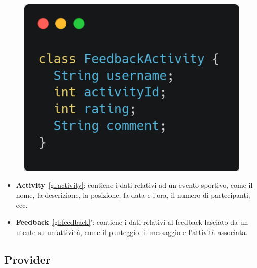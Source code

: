 \documentclass[a4paper,12pt]{article}
\begin{document}
\begin{figure}[h]
\begin{minipage}{0.45\textwidth}
        \includegraphics[width=0.9\linewidth]{img/feedback.png}
    \end{minipage}
\end{figure}


\begin{itemize}
    \item \textbf{Activity}~\ref{gl:activity}: contiene i dati relativi ad un evento sportivo, come il nome, la descrizione, la posizione, la data e l'ora, il numero di partecipanti, ecc.
    \item \textbf{Feedback}~\ref{gl:feedback}': contiene i dati relativi al feedback lasciato da un utente su un'attività, come il punteggio, il messaggio e l'attività  associata. 
\end{itemize}

\newpage

\subsection{Provider}
\end{document}
